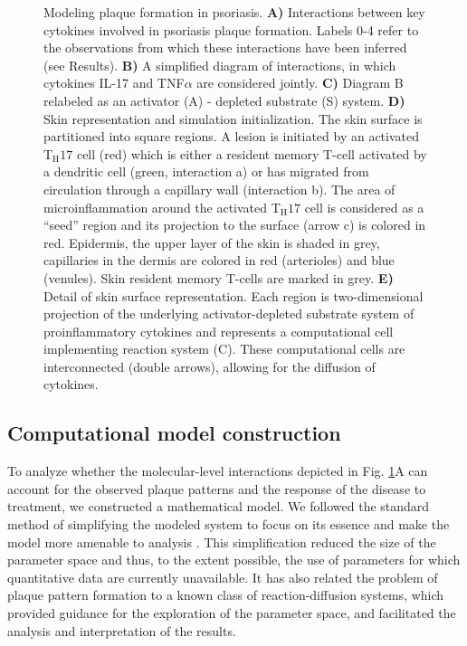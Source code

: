 \begin{figure}[p]
	\centering
	\caption{Modeling plaque formation in psoriasis. \textbf{A)} Interactions between key cytokines involved in psoriasis plaque formation. Labels 0-4 refer to the observations from which these interactions have been inferred (see Results). \textbf{B)} A simplified diagram of interactions, in which cytokines IL-17 and TNF$\alpha$ are considered jointly. \textbf{C)} Diagram B relabeled as an activator (A) - depleted substrate (S) system. \textbf{D)} Skin representation and simulation initialization. The skin surface is partitioned into square regions. A lesion is initiated by an activated T$_{\text{H}}17$ cell (red) which is either a resident memory T-cell activated by a dendritic cell (green, interaction a) or has migrated from circulation through a capillary wall (interaction b). The area of microinflammation around the activated T$_{\text{H}}17$ cell is considered as a “seed” region and its projection to the surface (arrow c) is colored in red.  Epidermis, the upper layer of the skin is shaded in grey, capillaries in the dermis are colored in red (arterioles) and blue (venules). Skin resident memory T-cells are marked in grey. \textbf{E)} Detail of skin surface representation. Each region is two-dimensional projection of the underlying activator-depleted substrate system of proinflammatory cytokines and represents a computational cell implementing reaction system (C). These computational cells are interconnected (double arrows), allowing for the diffusion of cytokines.}
	\label{fig:2}
\end{figure}

\subsection{Computational model construction}
To analyze whether the molecular-level interactions depicted in Fig. \ref{fig:2}A can account for the observed plaque patterns and the response of the disease to treatment, we constructed a mathematical model. We followed the standard method of simplifying the modeled system to focus on its essence and make the model more amenable to analysis \citep{bak1996, gaines1977, prusinkiewicz1998}. This simplification reduced the size of the parameter space and thus, to the extent possible, the use of parameters for which quantitative data are currently unavailable. It has also related the problem of plaque pattern formation to a known class of reaction-diffusion systems, which provided guidance for the exploration of the parameter space, and facilitated the analysis and interpretation of the results.
 
